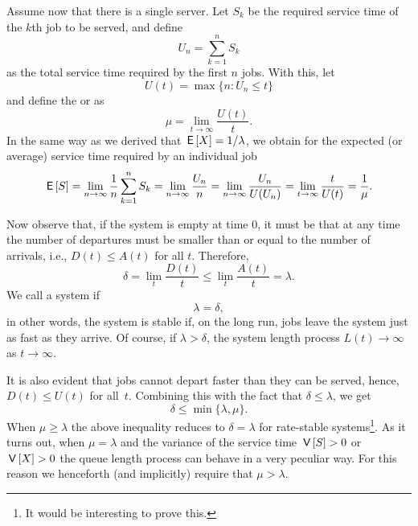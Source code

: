 Assume now that there is a single server.
Let $S_k$ be the required service time of the $k$th job to be served, and define
\begin{equation*}
U_n = \sum_{k=1}^n S_k
\end{equation*}
as the total service time required by the first $n$ jobs. With this,
let 
\begin{equation*}
  U(t) = \max\{n: U_n \leq t\}
\end{equation*}
and  define the  or  as
\begin{equation*}
  \mu = \lim_{t\to\infty} \frac{U(t)}t.
\end{equation*}
In the same way as we derived that $\,\mathsf{E}\left[X\right]= 1/\lambda$, we obtain for the expected (or average) service time required by an individual job
\begin{equation*}
  \,\mathsf{E}\left[S\right] = \lim_{n\to\infty} \frac 1 n \sum_{k=1}^n S_k = \lim_{n\to\infty} \frac{U_n}{n} = \lim_{n\to\infty} \frac{U_n}{U(U_n)} = \lim_{t\to\infty} \frac t{U(t)} = \frac 1 \mu.
\end{equation*}

Now observe that, if the system is empty at time $0$, it must be that
at any time the number of departures must be smaller than or equal to the number
of arrivals, i.e., $D(t) \leq A(t)$ for all $t$. Therefore,
\begin{equation}\label{eq:26}
\delta =   \lim_t \frac{D(t)}t \leq \lim_t \frac{A(t)}t = \lambda.
\end{equation}
We call a system  if
\begin{equation*}
  \lambda = \delta,
\end{equation*}
in other words, the system is stable if, on the long run, jobs leave
the system just as fast as they arrive. Of course, if
$\lambda > \delta$, the system length process $L(t) \to \infty$ as
$t\to \infty$.

It is also evident that jobs cannot depart faster than they can be
served, hence, $D(t) \leq U(t)$ for all~$t$. Combining this with the
fact that $\delta \leq \lambda$, we get
\begin{equation*}
  \delta \leq \min\{\lambda, \mu\}.
\end{equation*}
When $\mu \geq \lambda$ the above inequality reduces to $\delta = \lambda$ for rate-stable systems\footnote{\hspace{0.1em}It would be interesting to prove this.}.
As it turns out, when $\mu = \lambda$ and the variance of the service time $\,\mathsf{V}\left[S\right] > 0$ or $\,\mathsf{V}\left[X\right] >0$ the queue length process can behave in a very peculiar way.
For this reason we henceforth (and implicitly) require that $\mu > \lambda$.



